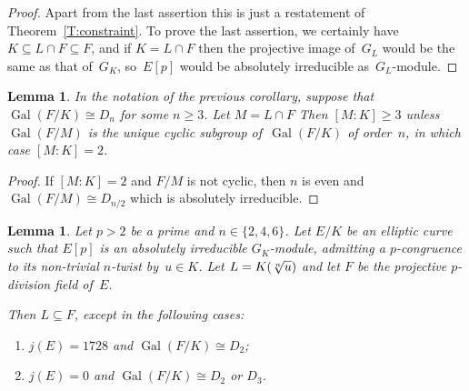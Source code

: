 \documentclass[12pt, reqno]{amsart}
\DeclareMathOperator{\Gal}{Gal}
\numberwithin{equation}{section}
\newtheorem{lemma}[theorem]{Lemma}
\theoremstyle{definition}
\theoremstyle{remark}
\begin{document}
\begin{proof}
Apart from the last assertion this is just a restatement of
Theorem~\ref{T:constraint}.  To prove the last assertion, we certainly
have $K\subseteq L\cap F\subseteq F$, and if $K=L\cap F$ then the
projective image of~$G_L$ would be the same as that of~$G_K$,
so~$E[p]$ would be absolutely irreducible as~$G_L$-module.
\end{proof}

\begin{lemma}\label{L:dihedral-to-reducible}
In the notation of the previous corollary, suppose that
$\Gal(F/K)\cong D_n$ for some $n\ge3$.  Let $M=L\cap F$ Then $[M:K]
\ge3$ unless $\Gal(F/M)$ is the unique cyclic subgroup of~$\Gal(F/K)$
of order~$n$, in which case $[M:K]=2$.
\end{lemma}
\begin{proof}
If $[M:K]=2$ and $F/M$ is not cyclic, then $n$ is even and
$\Gal(F/M)\cong D_{n/2}$ which is absolutely irreducible.
\end{proof}

\begin{lemma} \label{L:LinF}
Let $p > 2$ be a prime and $n \in \{2,4,6\}$.  Let $E/K$ be an
elliptic curve such that $E[p]$ is an absolutely irreducible
$G_K$-module, admitting a $p$-congruence to its non-trivial $n$-twist
by~$u \in K$. Let $L = K(\root n \of u)$ and let $F$ be the projective
$p$-division field of~$E$.

Then $L \subseteq F$, except in the following cases:
\begin{enumerate}
\item $j(E)=1728$ and $\Gal(F/K)\cong D_2$;
\item $j(E)=0$ and $\Gal(F/K)\cong D_2$ or $D_3$.
\end{enumerate}
\end{lemma}
\end{document}
